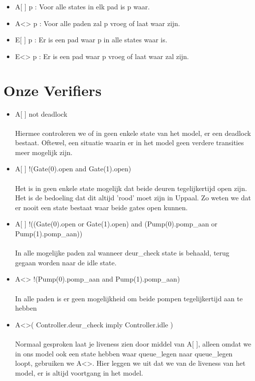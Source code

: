 \documentclass[oneside]{scrbook}
\begin{document}
\begin{itemize}
    \item A[ ] p : Voor alle states in elk pad is p waar.
    \item A<> p : Voor alle paden zal p vroeg of laat waar zijn.
    \item E[ ] p : Er is een pad waar p in alle states waar is.
    \item E<> p : Er is een pad waar p vroeg of laat waar zal zijn.
\end{itemize}
\section{Onze Verifiers}
\begin{itemize}
    \item A[ ] not deadlock \\
    \\Hiermee controleren we of in geen enkele state van het model, er een deadlock bestaat. Oftewel, een situatie waarin er in het model geen verdere transities meer mogelijk zijn.
    
    \item A[ ] !(Gate(0).open and Gate(1).open)\\
    \\Het is in geen enkele state mogelijk dat beide deuren tegelijkertijd open zijn. Het is de bedoeling dat dit altijd 'rood' moet zijn in Uppaal. Zo weten we dat er nooit een state bestaat waar beide gates open kunnen.
    
    \item A[ ] !((Gate(0).open or Gate(1).open) and (Pump(0).pomp\_aan or Pump(1).pomp\_aan))\\
    \\In alle mogelijke paden zal wanneer deur\_check state is behaald, terug gegaan worden naar de idle state.
    
    \item A<> !(Pump(0).pomp\_aan and Pump(1).pomp\_aan)\\ 
    \\In alle paden is er geen mogelijkheid om beide pompen tegelijkertijd aan te hebben
    
    \item A<>( Controller.deur\_check imply Controller.idle ) \\
    \\ Normaal gesproken laat je liveness zien door middel van A[ ], alleen omdat we in ons model ook een state hebben waar queue\_legen naar queue\_legen loopt, gebruiken we A<>. Hier leggen we uit dat we van de liveness van het model, er is altijd voortgang in het model.
    

\end{itemize}
\end{document}
